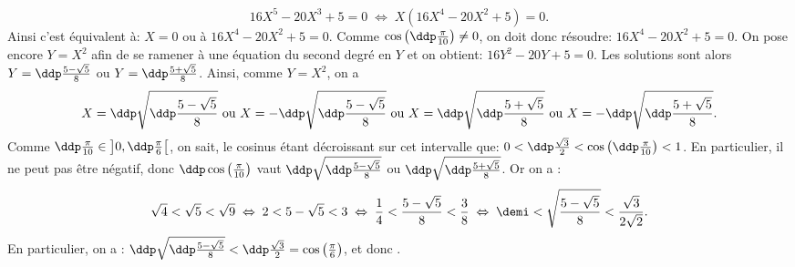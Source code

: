 \begin{correction}
\begin{enumerate}
\begin{itemize}
$$16X^5-20X^3+5 = 0 \; \Leftrightarrow \; X(16X^4-20X^2+5)=0.$$
Ainsi c'est \'equivalent \`{a}: $X=0$ ou \`{a} $16X^4-20X^2+5=0$. Comme $\cos{\left( \ddp\frac{\pi}{10}\right)}\not =0$, on doit donc r\'esoudre: $16X^4-20X^2+5=0$. On pose encore $Y=X^2$ afin de se ramener \`{a} une \'equation du second degr\'e en $Y$ et on obtient: $16Y^2-20Y+5=0$. Les solutions sont alors $Y=\ddp\frac{5-\sqrt{5}}{8}$ ou $Y=\ddp\frac{5+\sqrt{5}}{8}$. Ainsi, comme $Y=X^2$, on a
$$ X=\ddp\sqrt{\ddp\frac{5-\sqrt{5}}{8}}\ \hbox{ou}\ X=-\ddp\sqrt{\ddp\frac{5-\sqrt{5}}{8}}\ \hbox{ou}\ X=\ddp\sqrt{\ddp\frac{5+\sqrt{5}}{8}}\ \hbox{ou}\ X=-\ddp\sqrt{\ddp\frac{5+\sqrt{5}}{8}}.$$
Comme $\ddp\frac{\pi}{10}\in\left\rbrack 0,\ddp\frac{\pi}{6}\right\lbrack$, on sait, le cosinus \'etant d\'ecroissant sur cet intervalle que: $0<\ddp\frac{\sqrt{3}}{2}<\cos{\left( \ddp\frac{\pi}{10}\right)}<1$. En particulier, il ne peut pas \^{e}tre n\'egatif, donc $\ddp \cos\left(\frac{\pi}{10}\right)$ vaut $\ddp\sqrt{\ddp\frac{5-\sqrt{5}}{8}}$ ou $\ddp\sqrt{\ddp\frac{5+\sqrt{5}}{8}}$. Or on a :
$$\sqrt{4} < \sqrt{5} < \sqrt{9} \; \Leftrightarrow \; 2 < 5-\sqrt{5} < 3 \; \Leftrightarrow \; \frac{1}{4} <\frac{5-\sqrt{5}}{8} < \frac{3}{8} \; \Leftrightarrow \; \demi < \sqrt{\frac{5-\sqrt{5}}{8}} < \frac{\sqrt{3}}{2\sqrt{2}}.$$
En particulier, on a :  $\ddp\sqrt{\ddp\frac{5-\sqrt{5}}{8}}<\ddp\frac{\sqrt{3}}{2}=\cos\left(\frac{\pi}{6}\right)$, et donc 
 .
\end{itemize}
\end{enumerate}
\end{correction}